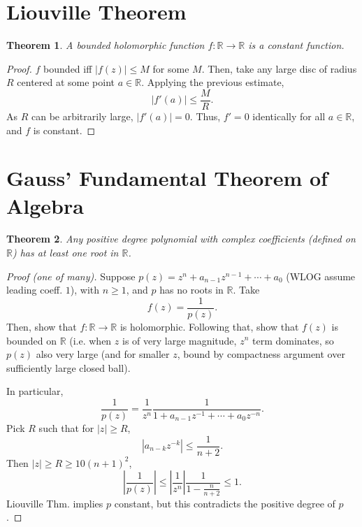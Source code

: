 \documentclass{artikel3}
\newcommand{\abs}[1]{\left|#1\right|}
\newcommand{\complex}{\mathbb{R}}
\newtheorem{thm}{Theorem}
\numberwithin{equation}{enumi}
\begin{document}
\section{Liouville Theorem}
\begin{thm}
	A bounded holomorphic function $f:\complex\to\complex$ is a constant
	function.
\end{thm}
\begin{proof}
	$f$ bounded iff $\abs{f(z)}\leq M$ for some $M$.  Then, take any large disc
	of radius $R$ centered at some point $a\in\complex$.  Applying the previous estimate, \[
		\abs{f'(a)}\leq \frac{M}{R}.
	\] As $R$ can be arbitrarily large, $\abs{f'(a)}=0$.  Thus, $f'=0$ identically
	for all $a\in\complex$, and $f$ is constant.
\end{proof}

\section{Gauss' Fundamental Theorem of Algebra}
\begin{thm}
	Any positive degree polynomial
	with complex coefficients (defined on $\complex$) has at least one root in $\complex$.
\end{thm}

\begin{proof}[Proof (one of many)]
	Suppose $p(z)=z^n+a_{n-1}z^{n-1}+\cdots +a_0$
	(WLOG assume leading coeff. $1$), with $n\geq 1$, and $p$ has no roots in $\complex$.
	Take \[
		f(z)=\frac{1}{p(z)}.
	\] Then, show that $f:\complex\to\complex$ is holomorphic.  Following that,
	show that $f(z)$ is bounded on $\complex$ (i.e. when $z$ is of very large
	magnitude, $z^n$ term dominates, so $p(z)$ also very large (and for smaller $z$,
	bound by compactness argument over sufficiently large closed ball).

	In particular, \[
		\frac{1}{p(z)}=\frac{1}{z^n}\frac{1}{1+a_{n-1}z^{-1}+\cdots+a_0z^{-n}}.
	\] Pick $R$ such that for $\abs{z}\geq R$, \[
		\abs{a_{n-k}z^{-k}}\leq \frac{1}{n+2}.
	\] Then $\abs{z}\geq R\geq 10(n+1)^2$, \[
		\abs{\frac{1}{p(z)}}\leq \abs{\frac{1}{z^n}}\frac{1}{1-\frac{n}{n+2}}\leq 1.
	\] Liouville Thm. implies $p$ constant, but this contradicts
	the positive degree of $p$.
\end{proof}
\label{lastpage}
\end{document}

